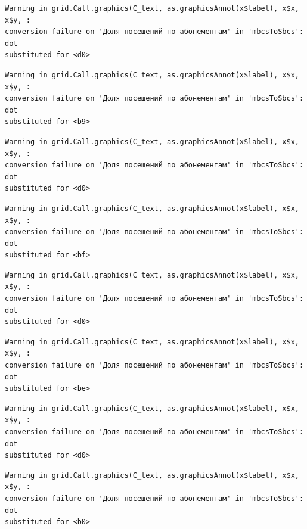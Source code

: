 \documentclass[
  letterpaper,
  DIV=11,
  numbers=noendperiod]{scrartcl}
\begin{document}
\begin{verbatim}
Warning in grid.Call.graphics(C_text, as.graphicsAnnot(x$label), x$x, x$y, :
conversion failure on 'Доля посещений по абонементам' in 'mbcsToSbcs': dot
substituted for <d0>
\end{verbatim}

\begin{verbatim}
Warning in grid.Call.graphics(C_text, as.graphicsAnnot(x$label), x$x, x$y, :
conversion failure on 'Доля посещений по абонементам' in 'mbcsToSbcs': dot
substituted for <b9>
\end{verbatim}

\begin{verbatim}
Warning in grid.Call.graphics(C_text, as.graphicsAnnot(x$label), x$x, x$y, :
conversion failure on 'Доля посещений по абонементам' in 'mbcsToSbcs': dot
substituted for <d0>
\end{verbatim}

\begin{verbatim}
Warning in grid.Call.graphics(C_text, as.graphicsAnnot(x$label), x$x, x$y, :
conversion failure on 'Доля посещений по абонементам' in 'mbcsToSbcs': dot
substituted for <bf>
\end{verbatim}

\begin{verbatim}
Warning in grid.Call.graphics(C_text, as.graphicsAnnot(x$label), x$x, x$y, :
conversion failure on 'Доля посещений по абонементам' in 'mbcsToSbcs': dot
substituted for <d0>
\end{verbatim}

\begin{verbatim}
Warning in grid.Call.graphics(C_text, as.graphicsAnnot(x$label), x$x, x$y, :
conversion failure on 'Доля посещений по абонементам' in 'mbcsToSbcs': dot
substituted for <be>
\end{verbatim}

\begin{verbatim}
Warning in grid.Call.graphics(C_text, as.graphicsAnnot(x$label), x$x, x$y, :
conversion failure on 'Доля посещений по абонементам' in 'mbcsToSbcs': dot
substituted for <d0>
\end{verbatim}

\begin{verbatim}
Warning in grid.Call.graphics(C_text, as.graphicsAnnot(x$label), x$x, x$y, :
conversion failure on 'Доля посещений по абонементам' in 'mbcsToSbcs': dot
substituted for <b0>
\end{verbatim}
\end{document}
